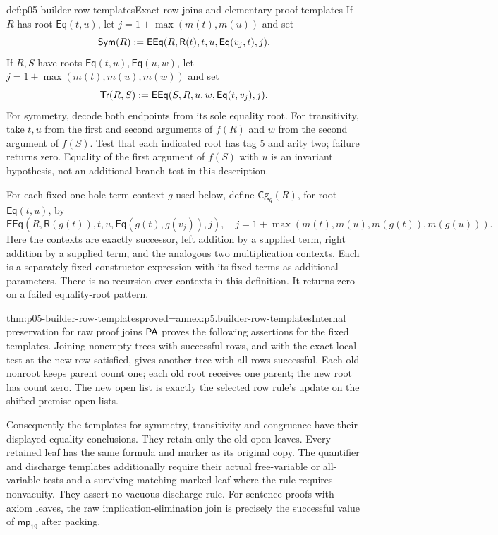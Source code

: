 \begin{hbdefinition}{def:p05-builder-row-templates}{Exact row joins and elementary proof templates}
If \(R\) has root \(\mathsf{Eq}(t,u)\), let \(j=1+\max(m(t),m(u))\) and set
\[
 \mathsf{Sym}(R)\mathrel{:=}
 \mathsf{EEq}(R,\mathsf R(t),t,u,\mathsf{Eq}(v_j,t),j).
\]
If \(R,S\) have roots \(\mathsf{Eq}(t,u),\mathsf{Eq}(u,w)\), let
\(j=1+\max(m(t),m(u),m(w))\) and set
\[
 \mathsf{Tr}(R,S)\mathrel{:=}\mathsf{EEq}(S,R,u,w,\mathsf{Eq}(t,v_j),j).
\]
For symmetry, decode both endpoints from its sole equality root. For
transitivity, take \(t,u\) from the first and second arguments of \(f(R)\)
and \(w\) from the second argument of \(f(S)\). Test that each indicated
root has tag 5 and arity two; failure returns zero. Equality of the first
argument of \(f(S)\) with \(u\) is an invariant hypothesis, not an
additional branch test in this description.

For each fixed one-hole term context \(g\) used below, define
\(\mathsf{Cg}_g(R)\), for root \(\mathsf{Eq}(t,u)\), by
\[
 \mathsf{EEq}(R,\mathsf R(g(t)),t,u,\mathsf{Eq}(g(t),g(v_j)),j),
 \quad j=1+\max(m(t),m(u),m(g(t)),m(g(u))).
\]
Here the contexts are exactly successor, left addition by a supplied term,
right addition by a supplied term, and the analogous two multiplication
contexts. Each is a separately fixed constructor expression with its fixed
terms as additional parameters. There is no recursion over contexts in this
definition. It returns zero on a failed equality-root pattern.
\end{hbdefinition}

\begin{hblemma}{thm:p05-builder-row-templates}{proved=annex:p5.builder-row-templates}{Internal preservation for raw proof joins}
\(\mathsf{PA}\) proves the following assertions for the fixed templates. Joining
nonempty trees with successful rows, and with the exact local test at the
new row satisfied, gives another tree with all rows successful. Each old
nonroot keeps parent count one; each old root receives one parent; the new
root has count zero. The new open list is exactly the selected row rule's
update on the shifted premise open lists.

Consequently the templates for symmetry, transitivity and congruence have
their displayed equality conclusions. They retain only the old open leaves.
Every retained leaf has the same formula and marker as its original copy.
The quantifier and discharge templates additionally require their actual
free-variable or all-variable tests and a surviving matching marked leaf
where the rule requires nonvacuity. They assert no vacuous discharge rule.
For sentence proofs with axiom leaves, the raw implication-elimination join
is precisely the successful value of \(\mathsf{mp}_{19}\) after packing.
\end{hblemma}

